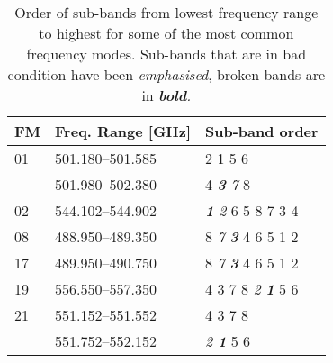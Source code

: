 \begin{table}
  \centering
  \caption{Order of sub-bands from lowest frequency range to highest for some
    of the most common frequency modes. Sub-bands that are in bad condition
    have been \emph{emphasised}, broken bands are in \emph{\textbf{bold}.}
    }\label{table:subbandorder}
  \begin{tabular}{lll}
    \toprule
    \textbf{FM} & \textbf{Freq. Range [GHz]} & \textbf{Sub-band order} \\
    \midrule
    01          & 501.180--501.585           & 2 1 5 6 \\
                & 501.980--502.380           & 4 \emph{\textbf{3} 7} 8 \\
    \midrule
    02          & 544.102--544.902           & \emph{\textbf{1} 2} 6 5 8 7 3 4 \\
    \midrule
    08          & 488.950--489.350           & 8 \emph{7 \textbf{3}} 4 6 5 1 2 \\
    \midrule
    17          & 489.950--490.750           & 8 \emph{7 \textbf{3}} 4 6 5 1 2 \\
    \midrule
    19          & 556.550--557.350           & 4 3 7 8 \emph{2 \textbf{1}} 5 6 \\
    \midrule
    21          & 551.152--551.552           & 4 3 7 8 \\
                & 551.752--552.152           & \emph{2 \textbf{1}} 5 6 \\
    \bottomrule
  \end{tabular}
\end{table}
